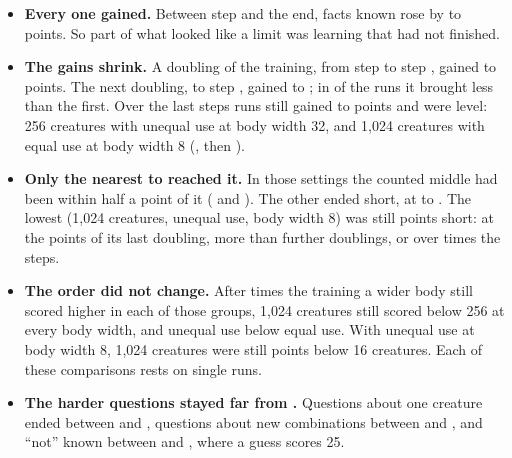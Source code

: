 \documentclass[10pt,letterpaper]{article}
\newcommand{\lead}[1]{\textbf{#1}}               %
\begin{document}
\begin{itemize}
\item \lead{Every one gained.} Between step \StepsShared{} and the end, facts known rose by
      \LongerGainLow{} to \LongerGainHigh{} points. So part of what looked like a limit was learning
      that had not finished.
\item \lead{The gains shrink.} A doubling of the training, from step \StepsShared{} to step
      \DoublingSecond, gained \DoublingEarlierLow{} to \DoublingEarlierHigh{} points. The next
      doubling, to step \DoublingThird, gained \DoublingLaterLow{} to \DoublingLaterHigh; in
      \LongerSlowing{} of the \RunsLonger{} runs it brought less than the first. Over the last
      \LastStretch{} steps \LongerStillWord{} runs still gained \LastGainLow{} to \LastGainHigh{}
      points and \LongerLevelWord{} were level: 256 creatures with unequal use at body width 32,
      and 1,024 creatures with equal use at body width 8 (\ExampleLongerLate, then
      \ExampleLongerEnd).
\item \lead{Only the \LongerReachedWord{} nearest to \KnownBar{} reached it.} In those
      \LongerReachedWord{} settings the counted middle had been within half a point of it
      (\ReachedBeforeLow{} and \ReachedBeforeHigh). The other \LongerShortWord{} ended short, at
      \ShortEndLow{} to \ShortEndHigh. The lowest (1,024 creatures, unequal use, body width 8) was
      still \LowestShort{} points short: at the \LowestPace{} points of its last doubling, more
      than \LowestDoublingsNeeded{} further doublings, or over \LowestTimesNeeded{} times the
      \StepsLonger{} steps.
\item \lead{The order did not change.} After \LongerTimesWord{} times the training a wider body
      still scored higher in each of those \LowGroupsWord{} groups, 1,024 creatures still scored
      below 256 at every body width, and unequal use below equal use. With unequal use at body
      width 8, 1,024 creatures were still \LongerGapSmall{} points below 16 creatures. Each of these
      comparisons rests on single runs.
\item \lead{The harder questions stayed far from \KnownBar.} Questions about one creature ended
      between \LongerQuestionsLow{} and \LongerQuestionsHigh, questions about new combinations
      between \LongerNewLow{} and \LongerNewHigh, and ``not'' known between \LongerNotLow{} and
      \LongerNotHigh, where a guess scores 25.
\end{itemize}
\end{document}
